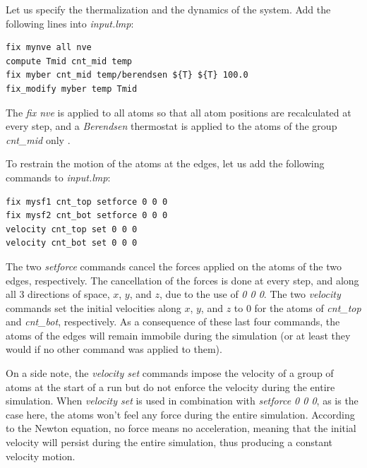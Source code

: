 \documentclass[9pt,tutorial]{livecoms}
\begin{document}
Let us specify the thermalization and the dynamics of the system. Add the following
lines into \textit{input.lmp}:
\begin{lstlisting}
fix mynve all nve
compute Tmid cnt_mid temp
fix myber cnt_mid temp/berendsen ${T} ${T} 100.0
fix_modify myber temp Tmid
\end{lstlisting}
The \textit{fix nve}
is applied to all atoms so that all atom positions are recalculated at every step,
and a \textit{Berendsen} thermostat is applied to the atoms of the group
\textit{cnt\_mid} only \cite{berendsen1984molecular}.
%

To restrain the motion of the atoms at the edges, let us add the following
commands to \textit{input.lmp}:
\begin{lstlisting}
fix mysf1 cnt_top setforce 0 0 0
fix mysf2 cnt_bot setforce 0 0 0
velocity cnt_top set 0 0 0
velocity cnt_bot set 0 0 0
\end{lstlisting}
The two \textit{setforce} commands cancel the forces applied on the atoms of the
two edges, respectively. The cancellation of the forces is done at every step,
and along all 3 directions of space, $x$, $y$, and $z$, due to the use of
\textit{0 0 0}. The two \textit{velocity} commands set the initial velocities
along $x$, $y$, and $z$ to 0 for the atoms of \textit{cnt\_top} and
\textit{cnt\_bot}, respectively. As a consequence of these last four commands,
the atoms of the edges will remain immobile during the simulation (or at least
they would if no other command was applied to them).

On a side note, the \textit{velocity set}
commands impose the velocity of a group of atoms at the start of a run but do
not enforce the velocity during the entire simulation. When \textit{velocity set}
is used in combination with \textit{setforce 0 0 0}, as is the case here, the
atoms won't feel any force during the entire simulation. According to the Newton
equation, no force means no acceleration, meaning that the initial velocity
will persist during the entire simulation, thus producing a constant velocity motion.
\end{document}
